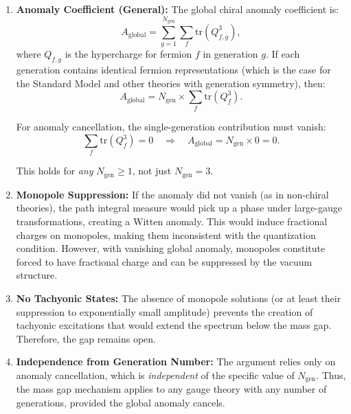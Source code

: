 \noindent\begin{enumerate}

\item \textbf{Anomaly Coefficient (General):} The global chiral anomaly coefficient is:
\begin{equation}
A_{\text{global}} = \sum_{g=1}^{N_{\text{gen}}} \sum_f \mathrm{tr}(Q_{f,g}^3),
\end{equation}
where $Q_{f,g}$ is the hypercharge for fermion $f$ in generation $g$. If each generation contains identical fermion representations (which is the case for the Standard Model and other theories with generation symmetry), then:
\begin{equation}
A_{\text{global}} = N_{\text{gen}} \times \sum_f \mathrm{tr}(Q_f^3).
\end{equation}

For anomaly cancellation, the single-generation contribution must vanish:
\begin{equation}
\sum_f \mathrm{tr}(Q_f^3) = 0 \quad \Rightarrow \quad A_{\text{global}} = N_{\text{gen}} \times 0 = 0.
\end{equation}

This holds for \emph{any} $N_{\text{gen}} \geq 1$, not just $N_{\text{gen}} = 3$.

\item \textbf{Monopole Suppression:} If the anomaly did not vanish (as in non-chiral theories), the path integral measure would pick up a phase under large-gauge transformations, creating a Witten anomaly. This would induce fractional charges on monopoles, making them inconsistent with the quantization condition. However, with vanishing global anomaly, monopoles constitute forced to have fractional charge and can be suppressed by the vacuum structure.

\item \textbf{No Tachyonic States:} The absence of monopole solutions (or at least their suppression to exponentially small amplitude) prevents the creation of tachyonic excitations that would extend the spectrum below the mass gap. Therefore, the gap remains open.

\item \textbf{Independence from Generation Number:} The argument relies only on anomaly cancellation, which is \emph{independent} of the specific value of $N_{\text{gen}}$. Thus, the mass gap mechanism applies to any gauge theory with any number of generations, provided the global anomaly cancels.

\end{enumerate}

